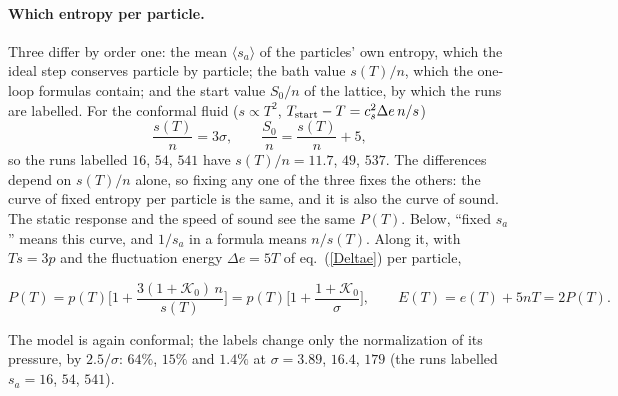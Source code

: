 \documentclass[11pt,aps,preprint,nofootinbib,superscriptaddress,tightenlines]{revtex4-2}
\newcommand{\avg}[1]{\langle #1\rangle}
\def\st{\begin{equation}}
\def\stp{\end{equation}}
\def\Eq#1{eq.~(\ref{#1})}
\let\oldparagraph\paragraph
\renewcommand{\paragraph}{\par\bigskip\oldparagraph}
\begin{document}
\paragraph{Which entropy per particle.}  Three differ by order one: the mean $\avg{s_a}$ of the particles' own entropy, which the ideal step conserves particle by
particle; the bath value $s(T)/n$, which the one-loop formulas contain; and the start value $S_0/n$ of the lattice, by which the runs are labelled.  For the
conformal fluid ($s\propto T^2$, $T_{\rm start}-T=c_s^2\Delta e\,n/s$)
\st
\frac{s(T)}{n}=3\sigma,\qquad \frac{S_0}n=\frac{s(T)}n+5 ,
\stp
so the runs labelled $16$, $54$, $541$ have $s(T)/n=11.7$, $49$, $537$.  The differences depend on $s(T)/n$ alone, so fixing any one of the three fixes the
others: the curve of fixed entropy per particle is the same, and it is also the curve of sound.  The static response and the speed of sound see the same $P(T)$.
Below, ``fixed $s_a$'' means this curve, and $1/s_a$ in a formula means $n/s(T)$.  Along it, with $Ts=3p$ and the fluctuation energy $\Delta e=5T$ of \Eq{Deltae} per particle,
\begin{keyeq}
\st
P(T)=p(T)\Big[1+\frac{3(1+\mathcal K_0)\,n}{s(T)}\Big]=p(T)\Big[1+\frac{1+\mathcal K_0}{\sigma}\Big],\qquad E(T)=e(T)+5nT=2P(T) .
\label{Pconf}
\stp
\end{keyeq}
The model is again conformal; the labels change only the normalization of its pressure, by $2.5/\sigma$: $64\%$, $15\%$ and $1.4\%$ at
$\sigma=3.89$, $16.4$, $179$ (the runs labelled $s_a=16$, $54$, $541$).
\end{document}
